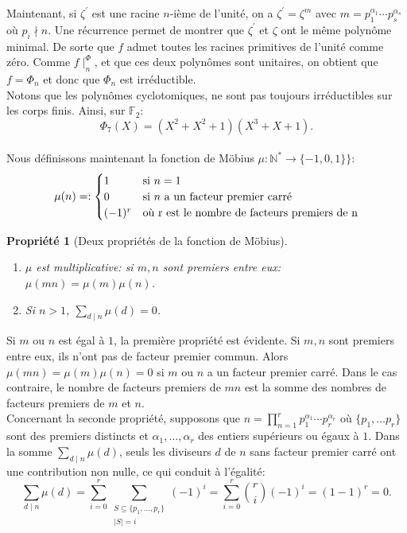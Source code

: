 \documentclass{article}
\theoremstyle{break}                  %
\newtheorem{propriete}{Propriété}
\begin{document}
Maintenant, si $\zeta^\prime$ est une racine $n$-ième de l'unité, on a $\zeta^\prime = \zeta^m$ avec $m = p_1^{\alpha_1} \cdots p_s^{\alpha_s}$ où $p_i \nmid n$. Une récurrence permet de montrer que $\zeta^\prime$ et $\zeta$ ont le même polynôme minimal. De sorte que $f$ admet toutes les racines primitives de l'unité comme zéro. Comme $f \mid^ \Phi_n$, et que ces deux polynômes sont unitaires, on obtient que $f = \Phi_n$ et donc que $\Phi_n$ est irréductible.\\



Notons que les polynômes cyclotomiques, ne sont pas toujours irréductibles sur les corps finis. Ainsi, sur $\mathbb F_2$:
$$\Phi_7(X)= (X^2+X^2+1)(X^3+X+1).$$\\


Nous définissons maintenant la fonction de Möbius $\mu : \mathbb N^* \to \{-1, 0, 1\}\}$:
\begin{displaymath}
	\mu(n) = :
	\begin{cases}
		1 & \text{si } n = 1\\
		0 & \text{si } n \text{ a un facteur premier carré}\\
		(-1)^r & \text{où } $r$ \text{ est le nombre de facteurs premiers de } $n$\\
	\end{cases}
\end{displaymath}

\begin{propriete}[Deux propriétés de la fonction de Möbius]
	\begin{enumerate}
		\item $\mu$ est multiplicative: si $m,n $ sont premiers entre eux: $\mu(mn)= \mu(m)\mu(n)$.
		\item Si $n >1$, $\displaystyle \sum_{d \mid n} \mu(d) = 0$.
	\end{enumerate}
\end{propriete}
Si $m$ ou $n$ est égal à $1$, la première propriété est évidente. Si $m,n$ sont premiers entre eux, ils n'ont pas de facteur premier commun. Alors $\mu(mn)=\mu(m)\mu(n)=0$ si $m$ ou $n$ a un facteur premier carré. Dans le cas contraire, le nombre de facteurs premiers de $mn$ est la somme des nombres de facteurs premiers de $m$ et $n$.\\

Concernant la seconde propriété, supposons que $n = \displaystyle \prod_{n = 1}^r p_1^{\alpha_1} \cdots p_r^{\alpha_r}$ où $\{p_1, \dots p_r\}$ sont des premiers distincts et $\alpha_1, \dots, \alpha_r$ des entiers supérieurs ou égaux à $1$. Dans la somme $\displaystyle \sum_{d \mid n} \mu(d)$, seuls les diviseurs $d$ de $n$ sans facteur premier carré ont une contribution non nulle, ce qui conduit à l'égalité:
$$\sum_{d \mid n} \mu(d) = \sum_{i = 0}^{r}\sum_{\substack{S \subseteq \{p_1, \dots, p_r\}\\ \left\vert S \right\vert = i}} (-1)^i = \sum_{i = 0}^{r} \binom{r}{i}(-1)^i =(1-1)^r=0.$$
\end{document}
